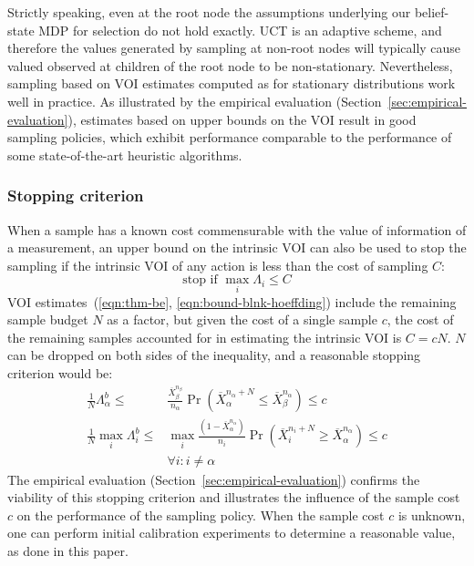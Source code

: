 \documentclass[]{article}
\begin{document}
Strictly speaking, even at the root node the assumptions underlying our belief-state
MDP for selection do not hold exactly. UCT is an adaptive scheme, and therefore the values
generated by sampling at non-root nodes will typically cause valued observed at
children of the root node to be non-stationary. 
Nevertheless, sampling based on VOI estimates
computed as for stationary distributions work well in
practice. As illustrated
by the empirical evaluation (Section~\ref{sec:empirical-evaluation}),
estimates based on upper bounds on the VOI result in good sampling
policies, which exhibit performance comparable to the performance of
some state-of-the-art heuristic algorithms.


\subsubsection{Stopping criterion}
\label{sec:control-stopping-criterion}

When a sample has a known cost commensurable with the value of
information of a measurement, an upper bound on the intrinsic VOI can also
be used to stop the sampling if the intrinsic VOI of any action
is less than the cost of sampling $C$:
\begin{equation}
\mbox{stop if } \max_i \Lambda_i \le C
\end{equation}
VOI estimates~(\ref{eqn:thm-be},
\ref{eqn:bound-blnk-hoeffding}) include the remaining sample budget $N$ as a
factor, but given the cost of a single sample $c$, the cost of the
remaining samples accounted for in estimating the intrinsic VOI is
$C=cN$. $N$ can be dropped on both sides of the inequality,
and a reasonable stopping criterion would be:
\begin{align}
\frac 1 N \Lambda_\alpha^b \le&\frac {\overline X_\beta^{n_\beta}}
  {n_\alpha}\Pr(\overline X_\alpha^{n_\alpha+N}\le\overline
  X_\beta^{n_\alpha})\le c\nonumber\\
\frac 1 N \max_i\Lambda_i^b\le &\max_i\frac {(1-\overline X_\alpha^{n_\alpha})} {n_i}\Pr(\overline
  X_i^{n_i+N}\ge\overline X_\alpha^{n_\alpha})\le c\nonumber\\
    &\forall i: i\ne\alpha
\label{eqn:stopping-blnk}
\end{align}
The empirical evaluation (Section~\ref{sec:empirical-evaluation})
confirms the viability of this stopping criterion and illustrates the
influence of the sample cost $c$ on the performance of
the sampling policy. When the sample cost $c$ is unknown, one can perform initial calibration experiments
to determine a reasonable value, as done in this paper.
\end{document}
